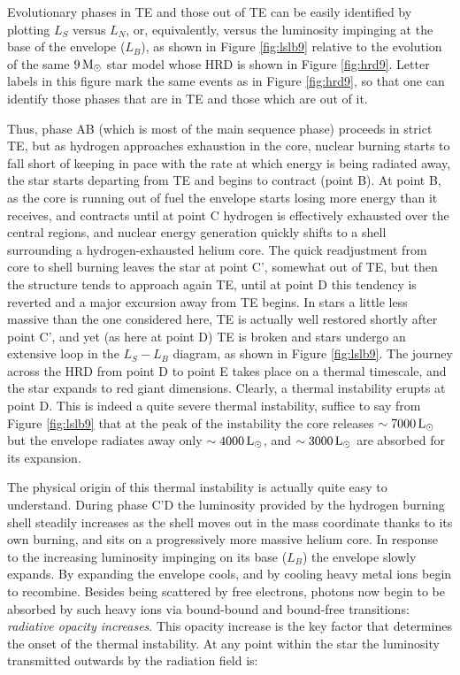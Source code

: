 \documentclass[a4paper,10pt]{article}
\begin{document}
{\noindent}Evolutionary phases in TE and those out of TE can be easily identified by plotting $L_S$ versus $L_N$, or, equivalently, versus the luminosity impinging at the base of the envelope ($L_B$), as shown in Figure \ref{fig:lslb9} relative to the evolution of the same $9\,{\rm M_\odot}$ star model whose HRD is shown in Figure \ref{fig:hrd9}. Letter labels in this figure mark the same events as in Figure \ref{fig:hrd9}, so that one can identify those phases that are in TE and those which are out of it.

{\noindent}Thus, phase AB (which is most of the main sequence phase) proceeds in strict TE, but as hydrogen approaches exhaustion in the core, nuclear burning starts to fall short of keeping in pace with the rate at which energy is being radiated away, the star starts departing from TE and begins to contract (point B). At point B, as the core is running out of fuel the envelope starts losing more energy than it receives, and contracts until at point C hydrogen is effectively exhausted over the central regions, and nuclear energy generation quickly shifts to a shell surrounding a hydrogen-exhausted helium core. The quick readjustment from core to shell burning leaves the star at point C', somewhat out of TE, but then the structure tends to approach again TE, until at point D this tendency is reverted and a major excursion away from TE begins. In stars a little less massive than the one considered here, TE is actually well restored shortly after point C', and yet (as here at point D) TE is broken and stars undergo an extensive loop in the $L_S-L_B$ diagram, as shown in Figure \ref{fig:lslb9}. The journey across the HRD from point D to point E takes place on a thermal timescale, and the star expands to red giant dimensions. Clearly, a thermal instability erupts at point D. This is indeed a quite severe thermal instability, suffice to say from Figure \ref{fig:lslb9} that at the peak of the instability the core releases $\sim7000\,{\rm L_\odot}$ but the envelope radiates away only $\sim4000\,{\rm L_\odot}$, and $\sim3000\,{\rm L_\odot}$ are absorbed for its expansion.

{\noindent}The physical origin of this thermal instability is actually quite easy to understand. During phase C'D the luminosity provided by the hydrogen burning shell steadily increases as the shell moves out in the mass coordinate thanks to its own burning, and sits on a progressively more massive helium core. In response to the increasing luminosity impinging on its base ($L_B$) the envelope slowly expands. By expanding the envelope cools, and by cooling heavy metal ions begin to recombine. Besides being scattered by free electrons, photons now begin to be absorbed by such heavy ions via bound-bound and bound-free transitions: \textit{radiative opacity increases}. This opacity increase is the key factor that determines the onset of the thermal instability. At any point within the star the luminosity transmitted outwards by the radiation field is:
\end{document}
